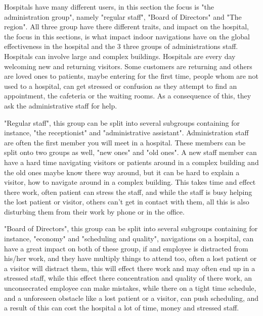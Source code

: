 Hospitals have many different users, in this section the focus is "the administration group", namely "regular staff", "Board of Directors" and "The region". All three group have there different traits, and impact on the hospital, the focus in this sections, is what impact indoor navigations have on the global effectiveness in the hospital and the 3 three groups of administrations staff. Hospitals can involve large and complex buildings. Hospitals are every day welcoming new and returning visitors. Some customers are returning and others are loved ones to patients, maybe entering for the first time, people whom are not used to a hospital, can get stressed or confusion as they attempt to find an appointment, the cafeteria or the waiting rooms. As a consequence of this, they ask the administrative staff for help.

"Regular staff", this group can be split into several subgroups containing for instance, "the receptionist" and "administrative assistant". Administration staff are often the first  member you will meet in a hospital. These members can be split onto two groups as well, "new ones" and "old ones". A new staff member can have a hard time navigating visitors or patients around in a complex building and the old ones maybe know there way around, but it can be hard to explain a visitor, how to navigate around in a complex building. This takes time and effect there work, often patient can stress the staff, and while the staff is busy helping the lost patient or visitor, others can't get in contact with them, all this is also disturbing them from their work by phone or in the office.

"Board of Directors", this group can be split into several subgroups containing for instance, "economy" and "scheduling and quality", navigations on a hospital, can have a great impact on both  of these group, if and employee is distracted from his/her work, and they have multiply things to attend too, often a lost patient or a visitor will distract them, this will effect there work and may often end up in a stressed staff, while this effect there concentration and quality of there work, an unconsecrated employee can make mistakes, while there on a tight time schedule, and a unforeseen obstacle like a lost patient or a visitor, can push scheduling, and a result of this can cost the hospital a lot of time, money and stressed staff. 

